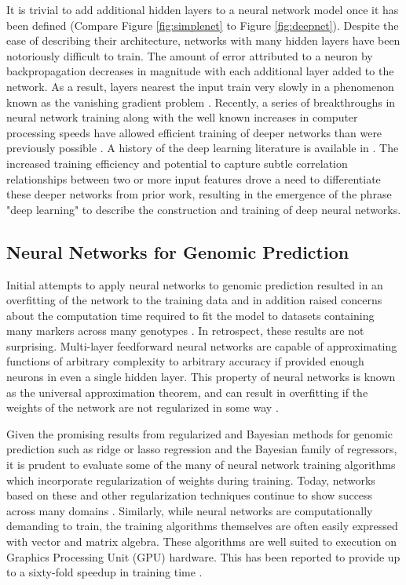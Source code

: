 
It is trivial to add additional hidden layers to a neural network 
model once it has been defined (Compare Figure \ref{fig:simplenet} to Figure \ref{fig:deepnet}). 
Despite the ease of describing their architecture, networks with many hidden 
layers have been notoriously difficult to train. The amount of error
attributed to a neuron by backpropagation decreases in magnitude with each
additional layer added to the network. As a result, layers nearest the input train
very slowly in a phenomenon known as the vanishing gradient problem \citep{hochreiter1998}. 
Recently, a series of breakthroughs in neural network training 
along with the well known increases in computer processing speeds have allowed efficient training 
of deeper networks 
than were previously possible \citep{sutskever2013}.
A history of the deep learning literature is available in \cite{lecun2015}.
The increased training efficiency and potential to capture subtle
correlation relationships between two or more input features drove a need to 
differentiate these deeper networks from prior work, resulting in 
the emergence of the phrase "deep learning" to describe the construction 
and training of deep neural networks.

\subsection*{Neural Networks for Genomic Prediction}

Initial attempts to apply neural networks to genomic prediction resulted in 
an overfitting of the network to the training data and in addition raised 
concerns about the computation time required to fit the model to datasets containing
many markers across many genotypes \citep{heslot2012, gonzalez-recio2014}. 
In retrospect, these results are not surprising. Multi-layer feedforward neural networks 
are capable of approximating functions of arbitrary complexity to arbitrary 
accuracy if provided enough neurons in even a single hidden 
layer. This property of neural networks is known as the 
universal approximation theorem, and can result in
overfitting if the weights of the network are not regularized in some way \citep{hornik1989}.

Given the promising results from regularized and Bayesian methods for 
genomic prediction such as ridge or lasso regression and the Bayesian family of regressors,
it is prudent to evaluate some of the many of neural network training algorithms which
incorporate regularization of weights during training. Today, networks based on these 
and other regularization techniques continue to show success 
across many domains \citep{schmidhuber2015}. Similarly, while neural networks are 
computationally demanding to train, the training algorithms 
themselves are often easily expressed with vector and matrix algebra. These algorithms are 
well suited to execution on Graphics Processing Unit (GPU) hardware. This has been reported
to provide up to a sixty-fold speedup in training time \citep{sierra2010, schmidhuber2015}. 


